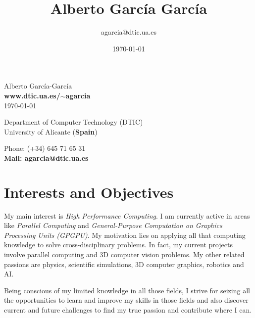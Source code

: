 \documentclass[8pt]{article}
\title{\bfseries\Huge Alberto García García}
\author{agarcia@dtic.ua.es}
\date{\today}
\begin{document}
\begin{center}
	\Huge Alberto García-García\\
	\Large \textbf{www.dtic.ua.es/$\sim$agarcia}\\
	\today
\end{center}
\bigskip
\begin{minipage}[ht]{0.65\textwidth}
Department of Computer Technology (DTIC)\\
University of Alicante (\textbf{Spain})\\
\end{minipage}
\hfill
\begin{minipage}[ht]{0.3\textwidth}
Phone: (+34) 645 71 65 31\\
\textbf{Mail: agarcia@dtic.ua.es}\\
\end{minipage}
 
\section*{Interests and Objectives}

My main interest is \emph{High Performance Computing}. I am currently active in areas like \emph{Parallel Computing} and \emph{General-Purpose Computation on Graphics Processing Units (GPGPU)}. My motivation lies on applying all that computing knowledge to solve cross-disciplinary problems. In fact, my current projects involve parallel computing and 3D computer vision problems. My other related passions are physics, scientific simulations, 3D computer graphics, robotics and AI.

Being conscious of my limited knowledge in all those fields, I strive for seizing all the opportunities to learn and improve my skills in those fields and also discover current and future challenges to find my true passion and contribute where I can.
 
\end{document}

